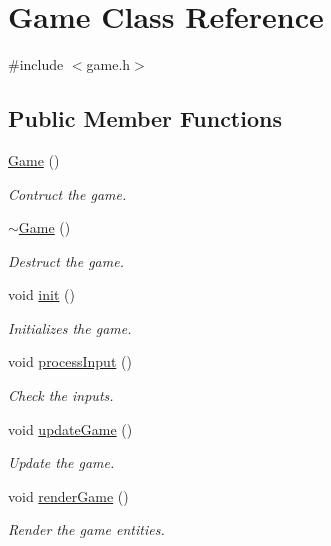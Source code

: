 \hypertarget{class_game}{}\section{Game Class Reference}
\label{class_game}


{\ttfamily \#include $<$game.\+h$>$}

\subsection*{Public Member Functions}
\begin{DoxyCompactItemize}
\item 
\hyperlink{class_game_ad59df6562a58a614fda24622d3715b65}{Game} ()
\begin{DoxyCompactList}\small\item\em Contruct the game. \end{DoxyCompactList}\item 
\hyperlink{class_game_ae3d112ca6e0e55150d2fdbc704474530}{$\sim$\+Game} ()
\begin{DoxyCompactList}\small\item\em Destruct the game. \end{DoxyCompactList}\item 
void \hyperlink{class_game_a6f3a33940524b6ba9d83f627ccb14bbf}{init} ()
\begin{DoxyCompactList}\small\item\em Initializes the game. \end{DoxyCompactList}\item 
void \hyperlink{class_game_a815a3ec2787b4b1c4077d28165c380e8}{process\+Input} ()
\begin{DoxyCompactList}\small\item\em Check the inputs. \end{DoxyCompactList}\item 
void \hyperlink{class_game_a67a8c5c0356c9ad33fac1abc435a3746}{update\+Game} ()
\begin{DoxyCompactList}\small\item\em Update the game. \end{DoxyCompactList}\item 
void \hyperlink{class_game_a4573580347746dbb7dbe568383682ed3}{render\+Game} ()
\begin{DoxyCompactList}\small\item\em Render the game entities. \end{DoxyCompactList}\item 

\end{DoxyCompactItemize}
